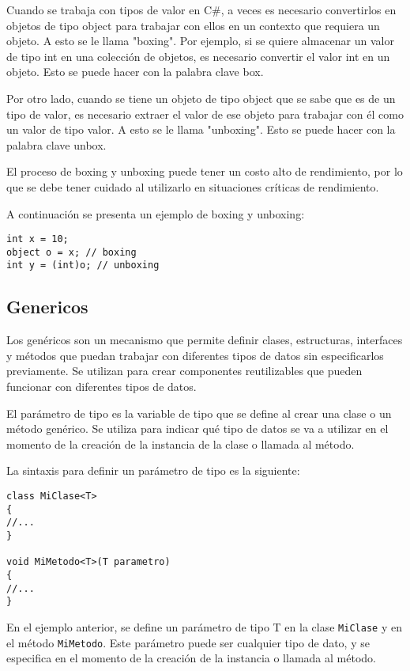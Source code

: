 \documentclass[executivepaper]{article}
\begin{document}
Cuando se trabaja con tipos de valor en C\#, a veces es necesario convertirlos en objetos de tipo object para trabajar con ellos en un contexto que requiera un objeto. A esto se le llama "boxing". Por ejemplo, si se quiere almacenar un valor de tipo int en una colección de objetos, es necesario convertir el valor int en un objeto. Esto se puede hacer con la palabra clave box.

Por otro lado, cuando se tiene un objeto de tipo object que se sabe que es de un tipo de valor, es necesario extraer el valor de ese objeto para trabajar con él como un valor de tipo valor. A esto se le llama "unboxing". Esto se puede hacer con la palabra clave unbox.

El proceso de boxing y unboxing puede tener un costo alto de rendimiento, por lo que se debe tener cuidado al utilizarlo en situaciones críticas de rendimiento.

A continuación se presenta un ejemplo de boxing y unboxing:

\begin{lstlisting}
int x = 10;
object o = x; // boxing
int y = (int)o; // unboxing
\end{lstlisting}

\subsection*{Genericos}

Los genéricos son un mecanismo que permite definir clases, estructuras, interfaces y métodos que puedan trabajar con diferentes tipos de datos sin especificarlos previamente. Se utilizan para crear componentes reutilizables que pueden funcionar con diferentes tipos de datos.

El parámetro de tipo es la variable de tipo que se define al crear una clase o un método genérico. Se utiliza para indicar qué tipo de datos se va a utilizar en el momento de la creación de la instancia de la clase o llamada al método.

La sintaxis para definir un parámetro de tipo es la siguiente:

\begin{lstlisting}
class MiClase<T>
{
//...
}

void MiMetodo<T>(T parametro)
{
//...
}
\end{lstlisting}

En el ejemplo anterior, se define un parámetro de tipo T en la clase \texttt{MiClase} y en el método \texttt{MiMetodo}. Este parámetro puede ser cualquier tipo de dato, y se especifica en el momento de la creación de la instancia o llamada al método.
\end{document}
